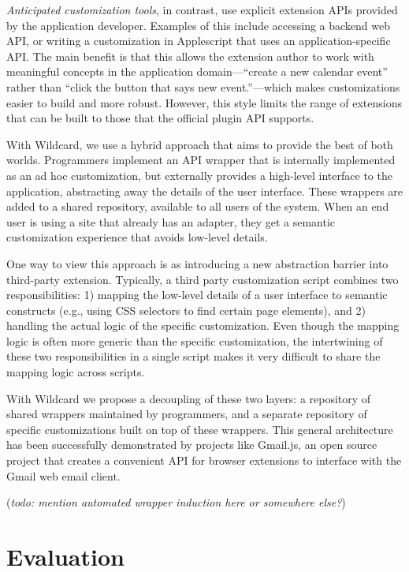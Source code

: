 \documentclass[sigplan,10pt,anonymous,review]{acmart}
\begin{document}
\emph{Anticipated customization tools}, in contrast, use explicit
extension APIs provided by the application developer. Examples of this
include accessing a backend web API, or writing a customization in
Applescript that uses an application-specific API. The main benefit is
that this allows the extension author to work with meaningful concepts
in the application domain---``create a new calendar event'' rather than
``click the button that says new event.''---which makes customizations
easier to build and more robust. However, this style limits the range of
extensions that can be built to those that the official plugin API
supports.

With Wildcard, we use a hybrid approach that aims to provide the best of
both worlds. Programmers implement an API wrapper that is internally
implemented as an ad hoc customization, but externally provides a
high-level interface to the application, abstracting away the details of
the user interface. These wrappers are added to a shared repository,
available to all users of the system. When an end user is using a site
that already has an adapter, they get a semantic customization
experience that avoids low-level details.

One way to view this approach is as introducing a new abstraction
barrier into third-party extension. Typically, a third party
customization script combines two responsibilities: 1) mapping the
low-level details of a user interface to semantic constructs (e.g.,
using CSS selectors to find certain page elements), and 2) handling the
actual logic of the specific customization. Even though the mapping
logic is often more generic than the specific customization, the
intertwining of these two responsibilities in a single script makes it
very difficult to share the mapping logic across scripts.

With Wildcard we propose a decoupling of these two layers: a repository
of shared wrappers maintained by programmers, and a separate repository
of specific customizations built on top of these wrappers. This general
architecture has been successfully demonstrated by projects like
Gmail.js, an open source project that creates a convenient API for
browser extensions to interface with the Gmail web email client.

(\emph{todo: mention automated wrapper induction here or somewhere
else?})

\hypertarget{sec:evaluation}{%
\section{Evaluation}\label{sec:evaluation}}
\end{document}
